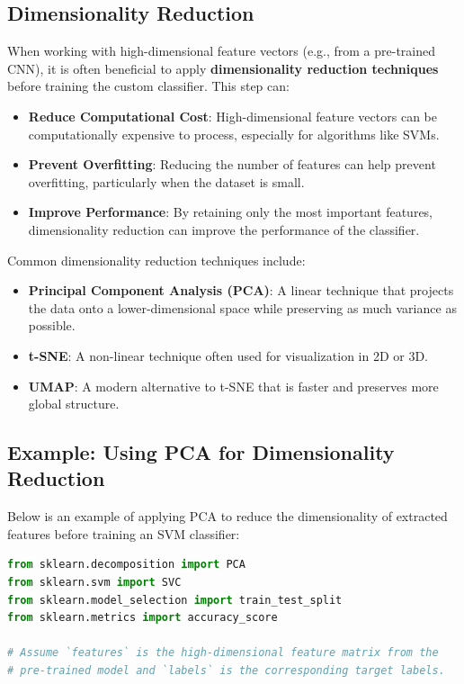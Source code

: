 \begin{notechapter}
\subsection{Dimensionality Reduction}
When working with high-dimensional feature vectors (e.g., from a pre-trained CNN),
it is often beneficial to apply \textbf{dimensionality reduction techniques} before training
the custom classifier. This step can:
\begin{itemize}
    \item \textbf{Reduce Computational Cost}: High-dimensional feature vectors can be
          computationally expensive to process, especially for algorithms like SVMs.
    \item \textbf{Prevent Overfitting}: Reducing the number of features can help prevent
          overfitting, particularly when the dataset is small.
    \item \textbf{Improve Performance}: By retaining only the most important features,
          dimensionality reduction can improve the performance of the classifier.
\end{itemize}

Common dimensionality reduction techniques include:
\begin{itemize}
    \item \textbf{Principal Component Analysis (PCA)}: A linear technique that projects
          the data onto a lower-dimensional space while preserving as much variance as possible.
    \item \textbf{t-SNE}: A non-linear technique often used for visualization in 2D or 3D.
    \item \textbf{UMAP}: A modern alternative to t-SNE that is faster and preserves more global structure.
\end{itemize}

\subsection{Example: Using PCA for Dimensionality Reduction}
Below is an example of applying PCA to reduce the dimensionality of extracted features
before training an SVM classifier:

\begin{lstlisting}[language=Python, style=python]
from sklearn.decomposition import PCA
from sklearn.svm import SVC
from sklearn.model_selection import train_test_split
from sklearn.metrics import accuracy_score

# Assume `features` is the high-dimensional feature matrix from the
# pre-trained model and `labels` is the corresponding target labels.


\end{lstlisting}
\end{notechapter}
